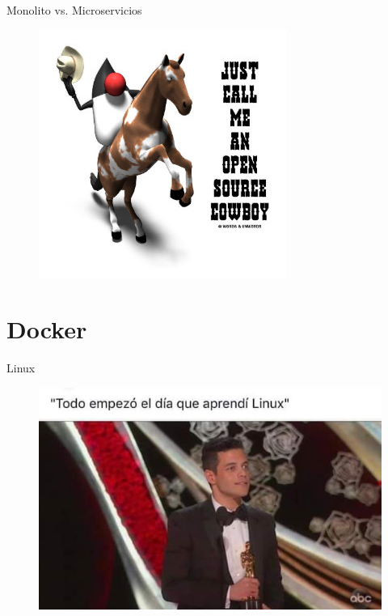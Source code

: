 \documentclass{beamer}
\begin{document}
\begin{frame}{Monolito vs. Microservicios}
\begin{figure}
	\centering
	\includegraphics[width=0.7\linewidth]{Images/dukecowboy}
\end{figure}
\end{frame}

\section{Docker}

\begin{frame}{Linux}
\begin{figure}
	\centering
	\includegraphics[width=0.7\linewidth]{Images/linux}
	\label{fig:linux}
\end{figure}
\end{frame}
\end{document}
